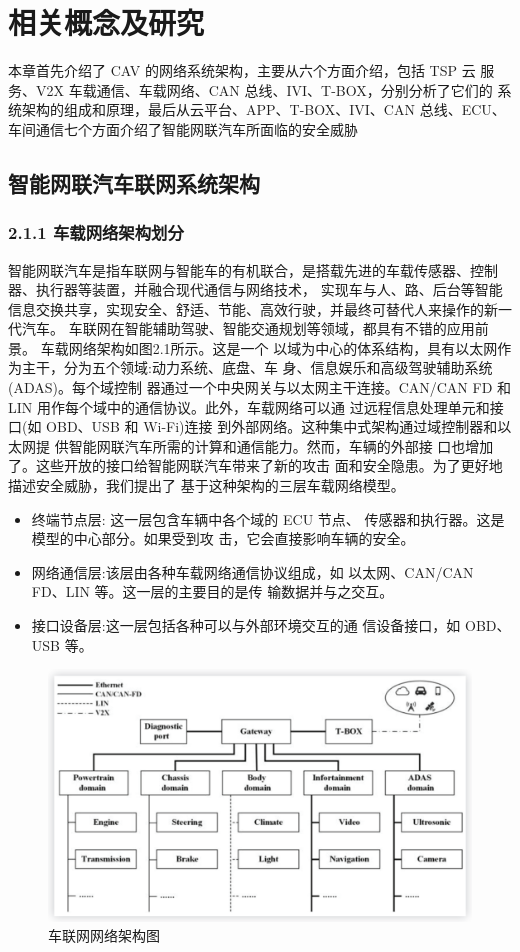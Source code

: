 \chapter{相关概念及研究}
\label{ch2}

本章首先介绍了 CAV 的网络系统架构，主要从六个方面介绍，包括 TSP 云
服务、V2X 车载通信、车载网络、CAN 总线、IVI、T-BOX，分别分析了它们的
系统架构的组成和原理，最后从云平台、APP、T-BOX、IVI、CAN 总线、ECU、
车间通信七个方面介绍了智能网联汽车所面临的安全威胁

\section{智能网联汽车联网系统架构}

\subsection*{2.1.1 车载网络架构划分}
智能网联汽车是指车联网与智能车的有机联合，是搭载先进的车载传感器、控制器、执行器等装置，并融合现代通信与网络技术，
实现车与人、路、后台等智能信息交换共享，实现安全、舒适、节能、高效行驶，并最终可替代人来操作的新一代汽车\cite{icvsintro}。
车联网在智能辅助驾驶、智能交通规划等领域，都具有不错的应用前景。
车载网络架构如图2.1所示。这是一个
以域为中心的体系结构，具有以太网作为主干，分为五个领域:动力系统、底盘、车
身、信息娱乐和高级驾驶辅助系统(ADAS)。每个域控制
器通过一个中央网关与以太网主干连接。CAN/CAN FD 和
LIN 用作每个域中的通信协议。此外，车载网络可以通
过远程信息处理单元和接口(如 OBD、USB 和 Wi-Fi)连接
到外部网络。这种集中式架构通过域控制器和以太网提
供智能网联汽车所需的计算和通信能力。然而，车辆的外部接
口也增加了。这些开放的接口给智能网联汽车带来了新的攻击
面和安全隐患。为了更好地描述安全威胁，我们提出了
基于这种架构的三层车载网络模型。
\begin{itemize}
    \item 终端节点层: 这一层包含车辆中各个域的 ECU 节点、
    传感器和执行器。这是模型的中心部分。如果受到攻
    击，它会直接影响车辆的安全。
    \item 网络通信层:该层由各种车载网络通信协议组成，如
    以太网、CAN/CAN FD、LIN 等。这一层的主要目的是传
    输数据并与之交互。
    \item 接口设备层:这一层包括各种可以与外部环境交互的通
    信设备接口，如 OBD、USB 等。
\end{itemize}
\begin{figure}
  \centering
  \includegraphics[scale=0.6]{resources/img/i1.png}
  \caption{车联网网络架构图}
\end{figure}
